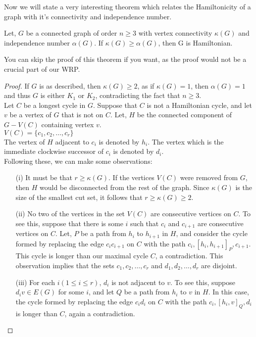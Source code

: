 \documentclass[../basic_graph_theory.tex]{subfiles}
\begin{document}
Now we will state a very interesting theorem which relates the Hamiltonicity of a graph with it's connectivity and independence number.

\begin{thm}
    Let, $G$ be a connected graph of order $n \ge 3$ with vertex connectivity $\kappa(G)$ and independence number $\alpha(G)$. If $\kappa(G) \ge \alpha(G)$, then G is Hamiltonian.
\end{thm}
You can skip the proof of this theorem if you want, as the proof would not be a crucial part of our WRP.
\begin{proof}
    If $G$ is as described, then $\kappa(G) \ge 2$, as if $\kappa(G)=1$, then $\alpha(G)=1$ and thus $G$ is either $K_1$ or $K_2$, contradicting the fact that $n \ge 3$.\\
    Let $C$ be a longest cycle in $G$. Suppose that $C$ is not a Hamiltonian cycle, and let $v$ be a vertex of $G$ that is not on $C$. Let, $H$ be the connected component of $G-V(C)$ containing vertex $v$.\\
    $V(C)=\{c_1,c_2,\dots,c_r\}$\\
    The vertex of $H$ adjacent to $c_i$ is denoted by $h_i$. The vertex which is the immediate clockwise successor of $c_i$ is denoted by $d_i$.\\
    Following these, we can make some observations:\\
    \begin{enumerate}
        \item[(i)] It must be that $r \ge \kappa(G)$. If the vertices $V(C)$ were removed from $G$, then $H$ would be disconnected from the rest of the graph. Since $\kappa(G)$ is the size of the smallest cut set, it follows that $r \ge \kappa(G) \ge 2$.
        \item[(ii)] No two of the vertices in the set $V(C)$ are consecutive vertices on $C$. To see this, suppose that there is some $i$ such that $c_i$ and $c_{i+1}$ are consecutive vertices on $C$. Let, $P$ be a path from $h_i$ to $h_{i+1}$ in $H$, and consider the cycle formed by replacing the edge $c_ic_{i+1}$ on $C$ with the path $c_i, [h_i, h_{i+1}]_{P} , c_{i+1}$. This cycle is longer than our maximal cycle $C$, a contradiction. This observation implies that the sets ${c_1, c_2,\dots,c_r}$ and ${d_1, d_2,\dots,d_r}$ are disjoint.
        \item[(iii)] For each $i (1 \le i \le r)$, $d_i$ is not adjacent to $v$. To see this, suppose $d_{i}v \in E(G)$ for some $i$, and let $Q$ be a path from $h_i$ to $v$ in $H$. In this case, the cycle formed by replacing the edge $c_{i}d_{i}$ on $C$ with the path $c_{i}, [h_{i}, v]_{Q}, d_{i}$ is longer than $C$, again a contradiction.

\end{enumerate}
\end{proof}
\end{document}
